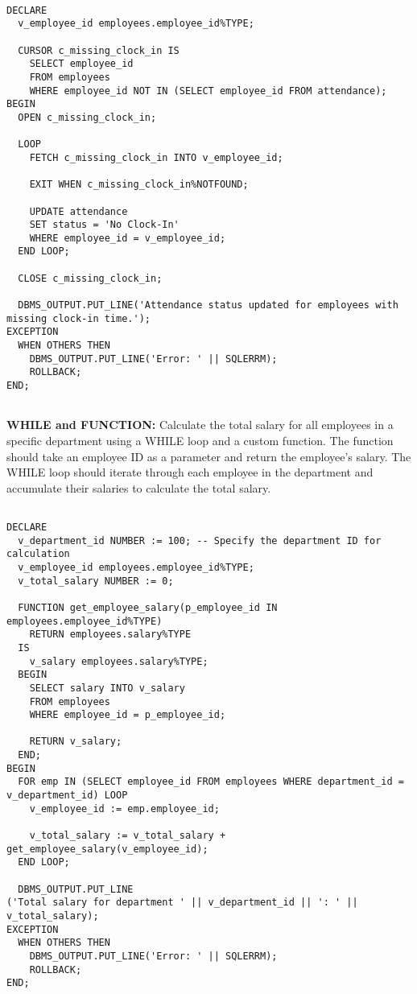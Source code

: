 \documentclass[11pt]{article} %
\begin{document}
\begin{small}
\begin{verbatim}

DECLARE
  v_employee_id employees.employee_id%TYPE;
  
  CURSOR c_missing_clock_in IS
    SELECT employee_id
    FROM employees
    WHERE employee_id NOT IN (SELECT employee_id FROM attendance);
BEGIN
  OPEN c_missing_clock_in;

  LOOP
    FETCH c_missing_clock_in INTO v_employee_id;
    
    EXIT WHEN c_missing_clock_in%NOTFOUND;

    UPDATE attendance
    SET status = 'No Clock-In'
    WHERE employee_id = v_employee_id;
  END LOOP;

  CLOSE c_missing_clock_in;

  DBMS_OUTPUT.PUT_LINE('Attendance status updated for employees with missing clock-in time.');
EXCEPTION
  WHEN OTHERS THEN
    DBMS_OUTPUT.PUT_LINE('Error: ' || SQLERRM);
    ROLLBACK;
END;


\end{verbatim}
\end{small}

\textbf{WHILE and FUNCTION:} Calculate the total salary for all employees in a specific department using a WHILE loop and a custom function. The function should take an employee ID as a parameter and return the employee's salary. The WHILE loop should iterate through each employee in the department and accumulate their salaries to calculate the total salary. 

\begin{small}
\begin{verbatim}

DECLARE
  v_department_id NUMBER := 100; -- Specify the department ID for calculation
  v_employee_id employees.employee_id%TYPE;
  v_total_salary NUMBER := 0;
  
  FUNCTION get_employee_salary(p_employee_id IN employees.employee_id%TYPE)
    RETURN employees.salary%TYPE
  IS
    v_salary employees.salary%TYPE;
  BEGIN
    SELECT salary INTO v_salary
    FROM employees
    WHERE employee_id = p_employee_id;
    
    RETURN v_salary;
  END;
BEGIN
  FOR emp IN (SELECT employee_id FROM employees WHERE department_id = v_department_id) LOOP
    v_employee_id := emp.employee_id;
    
    v_total_salary := v_total_salary + get_employee_salary(v_employee_id);
  END LOOP;
  
  DBMS_OUTPUT.PUT_LINE
('Total salary for department ' || v_department_id || ': ' || v_total_salary);
EXCEPTION
  WHEN OTHERS THEN
    DBMS_OUTPUT.PUT_LINE('Error: ' || SQLERRM);
    ROLLBACK;
END;

\end{verbatim}
\end{small}
\end{document}
